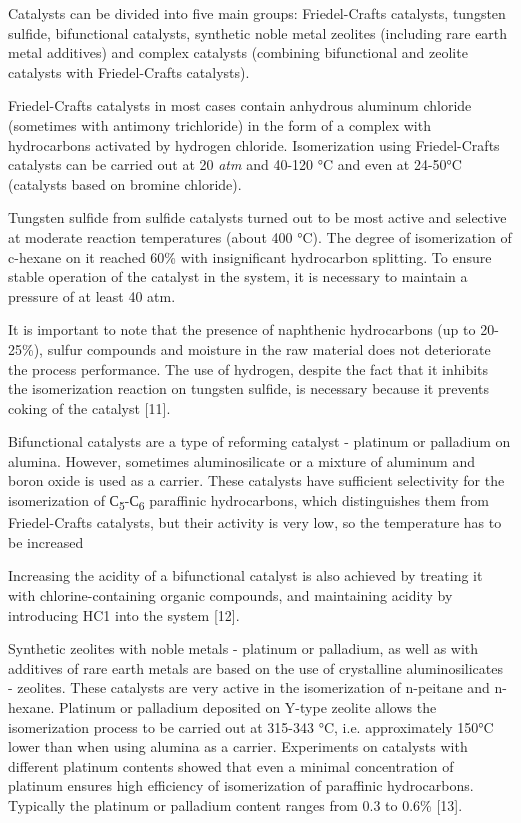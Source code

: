 Catalysts can be divided into five main groups: Friedel-Crafts
catalysts, tungsten sulfide, bifunctional catalysts, synthetic noble
metal zeolites (including rare earth metal additives) and complex
catalysts (combining bifunctional and zeolite catalysts with
Friedel-Crafts catalysts).

Friedel-Crafts catalysts in most cases contain anhydrous aluminum
chloride (sometimes with antimony trichloride) in the form of a complex
with hydrocarbons activated by hydrogen chloride. Isomerization using
Friedel-Crafts catalysts can be carried out at 20 \emph{atm} and 40-120
°C and even at 24-50°C (catalysts based on bromine chloride).

Tungsten sulfide from sulfide catalysts turned out to be most active and
selective at moderate reaction temperatures (about 400 °C). The degree
of isomerization of c-hexane on it reached 60\% with insignificant
hydrocarbon splitting. To ensure stable operation of the catalyst in the
system, it is necessary to maintain a pressure of at least 40 atm.

It is important to note that the presence of naphthenic hydrocarbons (up
to 20-25\%), sulfur compounds and moisture in the raw material does not
deteriorate the process performance. The use of hydrogen, despite the
fact that it inhibits the isomerization reaction on tungsten sulfide, is
necessary because it prevents coking of the catalyst {[}11{]}.

Bifunctional catalysts are a type of reforming catalyst - platinum or
palladium on alumina. However, sometimes aluminosilicate or a mixture of
aluminum and boron oxide is used as a carrier. These catalysts have
sufficient selectivity for the isomerization of
С\textsubscript{5}-С\textsubscript{6} paraffinic hydrocarbons, which
distinguishes them from Friedel-Crafts catalysts, but their activity is
very low, so the temperature has to be increased

Increasing the acidity of a bifunctional catalyst is also achieved by
treating it with chlorine-containing organic compounds, and maintaining
acidity by introducing HC1 into the system {[}12{]}.

Synthetic zeolites with noble metals - platinum or palladium, as well as
with additives of rare earth metals are based on the use of crystalline
aluminosilicates - zeolites. These catalysts are very active in the
isomerization of n-peitane and n-hexane. Platinum or palladium deposited
on Y-type zeolite allows the isomerization process to be carried out at
315-343 °C, i.e. approximately 150°C lower than when using alumina as a
carrier. Experiments on catalysts with different platinum contents
showed that even a minimal concentration of platinum ensures high
efficiency of isomerization of paraffinic hydrocarbons. Typically the
platinum or palladium content ranges from 0.3 to 0.6\% {[}13{]}.


